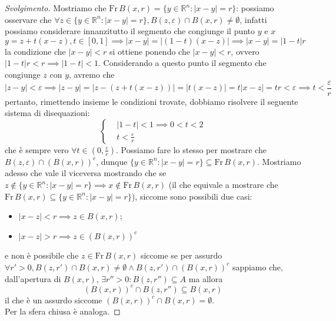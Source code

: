 \begin{proof}[Svolgimento]
	Mostriamo che $\text{Fr} \, B(x, r) = \{y \in \mathbb{R}^n : |x-y| = r \}$: %
	possiamo osservare che $\forall z \in \{y \in \mathbb{R}^n : |x-y| = r \}, B(z, \varepsilon) \cap B(x, r) \neq \emptyset$, infatti possiamo considerare innanzitutto il segmento che congiunge il punto $y$ e $x$
	\[
	y = z + t(x-z), t \in [0, 1] \implies |x-y| = |(1-t)(x-z)| \implies |x-y| = |1-t|r
	\]
	la condizione che $|x-y|<r$ si ottiene ponendo che $|x-y| < r$, ovvero $|1-t| r < r \implies |1-t| < 1$. Considerando a questo punto il segmento che congiunge $z$ con $y$, avremo che
	\[
	|z-y| < \varepsilon \implies |z-y| = |z-(z+t(x-z))| = |t(x-z)| = t|x-z| = tr < \varepsilon \implies t < \frac{\varepsilon}{r} 
	\]
	pertanto, rimettendo insieme le condizioni trovate, dobbiamo risolvere il seguente sistema di disequazioni:
	\begin{equation*}
	\begin{cases}
		&|1-t| < 1 \implies 0 < t < 2 \\
		&t < \frac{\varepsilon}{r}
	\end{cases}
	\end{equation*}
	che è sempre vero $\forall t \in (0, \frac{\varepsilon}{r})$. Possiamo fare lo stesso per mostrare che $B(z, \varepsilon) \cap (B(x, r))^c$, dunque $\{y \in \mathbb{R}^n: |x-y| = r \} \subseteq \text{Fr} \, B(x, r)$. Mostriamo adesso che vale il viceversa mostrando che 
	se $z \not\in \{y \in \mathbb{R}^n : |x-y| = r \} \implies x \not\in \text{Fr} \, B(x, r)$ (il che equivale a mostrare che $\text{Fr} \, B(x,r) \subseteq \{y \in \mathbb{R}^n : |x-y| = r \}$), siccome sono possibili due casi:
	\begin{itemize}
		\item $|x-z| < r \implies z \in B(x, r)$;
		\item $|x-z| > r \implies z \in (B(x, r))^c$
	\end{itemize}
	e non è possibile che $z \in \text{Fr} \, B(x, r)$ siccome se per assurdo $\forall r' > 0, B(z, r') \cap B(x, r) \neq \emptyset \wedge B(z, r') \cap (B(x, r))^c$ sappiamo che, dall'apertura di $B(x, r)$, $\exists r'' > 0: B(z, r'') \subseteq A$ ma allora
	\[
	(B(x, r))^c \cap B(z, r'') \subseteq B(x, r)
	\]
	il che è un assurdo siccome $(B(x,r))^c \cap B(x, r) = \emptyset$. \\
	Per la sfera chiusa è analoga.
\end{proof}
